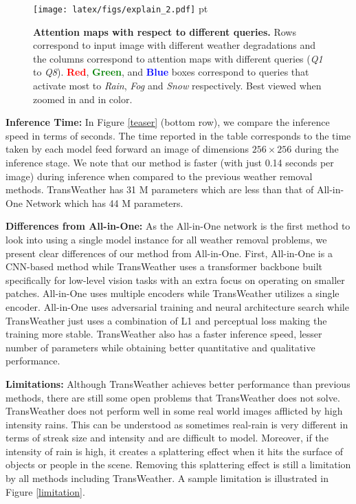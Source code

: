 \documentclass[10pt,twocolumn,letterpaper]{article}
\begin{document}
\begin{figure}[htbp]
	\centering
	\texttt{[image: latex/figs/explain\_2.pdf]} 
	 pt
	\caption{\textbf{Attention maps with respect to different queries.} Rows correspond to input image with different weather degradations and the columns correspond to attention maps with different queries (\textit{Q1} to \textit{Q8}). \textbf{\textcolor{red}{Red}}, \textbf{\textcolor{green}{Green}}, and \textbf{\textcolor{blue}{Blue}} boxes correspond to queries that activate most to \textit{Rain}, \textit{Fog} and \textit{Snow} respectively. Best viewed when zoomed in and in color.   }
	\label{explain}
	
\end{figure}


\noindent \textbf{Inference Time:} In Figure \ref{teaser} (bottom row), we compare the inference speed in terms of seconds. The time reported in the table corresponds to the time taken by each model feed forward an image of dimensions $256 \times 256$ during the inference stage. We note that our method is faster (with just 0.14 seconds per image) during inference when compared to the previous weather removal methods. TransWeather has 31 M parameters which are less than that of All-in-One Network which has 44 M parameters.






\noindent \textbf{Differences from All-in-One:} As the All-in-One network \cite{li2020all} is the first method to look into using a  single model instance for all weather removal problems, we present clear differences of our method from All-in-One. First, All-in-One is a CNN-based method while TransWeather uses a transformer backbone built specifically for low-level vision tasks with an extra focus on operating on smaller patches. All-in-One uses multiple encoders while TransWeather utilizes a single encoder. All-in-One uses adversarial training and neural architecture search while TransWeather just uses a combination of L1 and perceptual loss making the training more stable. TransWeather also has a faster inference speed, lesser number of parameters while obtaining better quantitative and qualitative performance.

\noindent \textbf{Limitations:} Although TransWeather achieves better performance than previous methods, there are still some open problems that TransWeather does not solve.  TransWeather does not perform well in some real world images afflicted by high intensity rains. This can be understood as sometimes real-rain is very different in terms of streak size and intensity and are difficult to model. Moreover, if the intensity of rain is high, it creates a splattering effect when it hits the surface of objects or people in the scene. Removing this splattering effect is still a limitation by all methods including TransWeather. A sample limitation is illustrated in Figure  \ref{limitation}.
\end{document}
